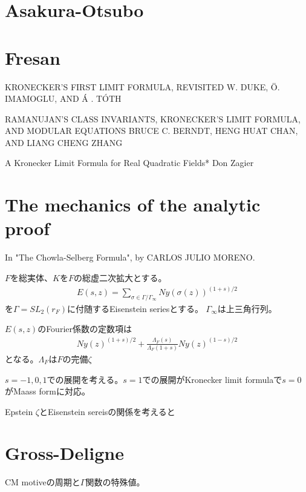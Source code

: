 \documentclass[uplatex, a4paper]{jsbook}
\begin{document}
\section{Asakura-Otsubo}

\section{Fresan}

KRONECKER’S FIRST LIMIT FORMULA, REVISITED
W. DUKE, \"O. IMAMOGLU, AND \'A . T\'OTH


RAMANUJAN’S CLASS INVARIANTS, KRONECKER’S LIMIT FORMULA, AND MODULAR EQUATIONS
BRUCE C. BERNDT, HENG HUAT CHAN, AND LIANG CHENG ZHANG


A Kronecker Limit Formula for Real Quadratic Fields* Don Zagier

\section{The mechanics of the analytic proof}
In "The Chowla-Selberg Formula", by CARLOS JULIO MORENO.

$F$を総実体、$K$を$F$の総虚二次拡大とする。
\begin{align*}
E(s,z)=\sum_{\sigma\in\Gamma/\Gamma_\infty}Ny(\sigma(z))^{(1+s)/2}
\end{align*}
を$\Gamma=SL_2(r_F)$に付随するEisenstein seriesとする。
$\Gamma_\infty$は上三角行列。

$E(s,z)$のFourier係数の定数項は
\begin{align*}
Ny(z)^{(1+s)/2}+\frac{\Lambda_F(s)}{\Lambda_F(1+s)}Ny(z)^{(1-s)/2}
\end{align*}
となる。$\Lambda_F$は$F$の完備$\zeta$

$s=-1, 0 , 1$での展開を考える。$s=1$での展開がKronecker limit formulaで$s=0$がMaass formに対応。

Epstein $\zeta$とEisenstein sereisの関係を考えると

\section{Gross-Deligne}
CM motiveの周期と$\Gamma$関数の特殊値。
\end{document}
